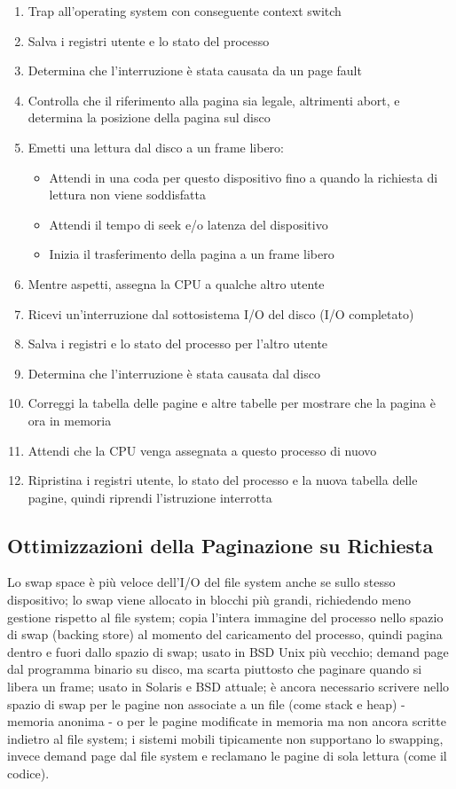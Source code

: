 \begin{enumerate}
  \item Trap all'operating system con conseguente context switch
  \item Salva i registri utente e lo stato del processo
  \item Determina che l'interruzione è stata causata da un page fault
  \item Controlla che il riferimento alla pagina sia legale, altrimenti abort, e determina la posizione della pagina sul disco
  \item Emetti una lettura dal disco a un frame libero:
        \begin{itemize}
          \item[] Attendi in una coda per questo dispositivo fino a quando la richiesta di lettura non viene soddisfatta
          \item[] Attendi il tempo di seek e/o latenza del dispositivo
          \item[] Inizia il trasferimento della pagina a un frame libero
        \end{itemize}
  \item Mentre aspetti, assegna la CPU a qualche altro utente
  \item Ricevi un'interruzione dal sottosistema I/O del disco (I/O completato)
  \item Salva i registri e lo stato del processo per l'altro utente
  \item Determina che l'interruzione è stata causata dal disco
  \item Correggi la tabella delle pagine e altre tabelle per mostrare che la pagina è ora in memoria
  \item Attendi che la CPU venga assegnata a questo processo di nuovo
  \item Ripristina i registri utente, lo stato del processo e la nuova tabella delle pagine, quindi riprendi l'istruzione interrotta
\end{enumerate}

\subsection{Ottimizzazioni della Paginazione su Richiesta}

Lo swap space è più veloce dell'I/O del file system anche se sullo stesso dispositivo; lo swap viene allocato in blocchi più grandi, richiedendo meno gestione rispetto al file system; copia l'intera immagine del processo nello spazio di swap (backing store) al momento del caricamento del processo, quindi pagina dentro e fuori dallo spazio di swap; usato in BSD Unix più vecchio; demand page dal programma binario su disco, ma scarta piuttosto che paginare quando si libera un frame; usato in Solaris e BSD attuale; è ancora necessario scrivere nello spazio di swap per le pagine non associate a un file (come stack e heap) - memoria anonima - o per le pagine modificate in memoria ma non ancora scritte indietro al file system; i sistemi mobili tipicamente non supportano lo swapping, invece demand page dal file system e reclamano le pagine di sola lettura (come il codice).

